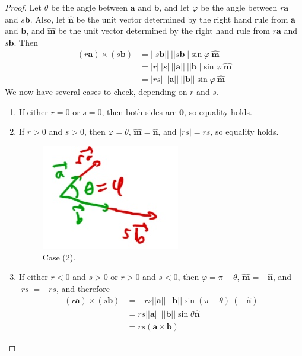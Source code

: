 \documentclass[12pt,letterpaper,reqno]{article}
\numberwithin{equation}{section}
\begin{document}
\begin{proof}
Let $\theta$ be the angle between $\mathbf{a}$ and $\mathbf{b}$, and let $\varphi$ be the angle between $r\mathbf{a}$ and $s\mathbf{b}$. Also, let $\mathbf{\hat{n}}$ be the unit vector determined by the right hand rule from $\mathbf{a}$ and $\mathbf{b}$, and $\mathbf{\hat{m}}$ be the unit vector determined by the right hand rule from $r\mathbf{a}$ and $s\mathbf{b}$. Then
\begin{align*}
	(r\mathbf{a}) \times (s\mathbf{b})&=||s\mathbf{b}|| \ ||s\mathbf{b}||\sin \varphi \ \mathbf{\hat{m}} \\
	&=|r|\ |s|\ ||\mathbf{a}|| \ ||\mathbf{b}|| \sin \varphi \ \mathbf{\hat{m}} \\
	&=|rs|\ ||\mathbf{a}|| \ ||\mathbf{b}|| \sin \varphi \ \mathbf{\hat{m}}
\end{align*}
We now have several cases to check, depending on $r$ and $s$.
\begin{enumerate}[(1)]
	\item If either $r=0$ or $s=0$, then both sides are $\mathbf{0}$, so equality holds.
	\item If $r>0$ and $s>0$, then $\varphi=\theta$, $\mathbf{\hat{m}}=\mathbf{\hat{n}}$, and $|rs|=rs$, so equality holds.
	\begin{figure}[h]
		\begin{center}
			\includegraphics[scale=0.5]{figures_mvc/cp_proof_case_2}
		\end{center}
		\caption{Case (2).}
	\end{figure}
	\item If either $r<0$ and $s>0$ or $r>0$ and $s<0$, then $\varphi=\pi-\theta$, $\mathbf{\hat{m}}=-\mathbf{\hat{n}}$, and $|rs|=-rs$, and therefore
	\begin{align*}
		(r\mathbf{a}) \times (s\mathbf{b})&=-rs||\mathbf{a}|| \ ||\mathbf{b}||  \sin (\pi-\theta) \ (-\mathbf{\hat{n}}) \\
		&=rs||\mathbf{a}|| \ ||\mathbf{b}|| \sin\theta \mathbf{\hat{n}} \\
		&=rs (\mathbf{a} \times \mathbf{b})

\end{align*}
\end{enumerate}
\end{proof}
\end{document}
